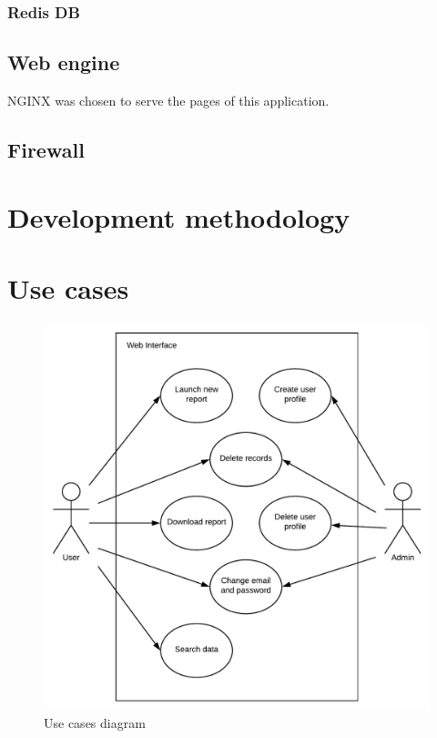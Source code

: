 \subsubsection{Redis DB}

\subsection{Web engine}
NGINX was chosen to serve the pages of this application.

\subsection{Firewall}

\section{Development methodology}

\section{Use cases}

\begin{figure}[h!]
\centering
\includegraphics[scale=0.4]{imgs/UseCasesDiag.pdf}
\caption{Use cases diagram}
\label{fig:sysarch}
\end{figure}

